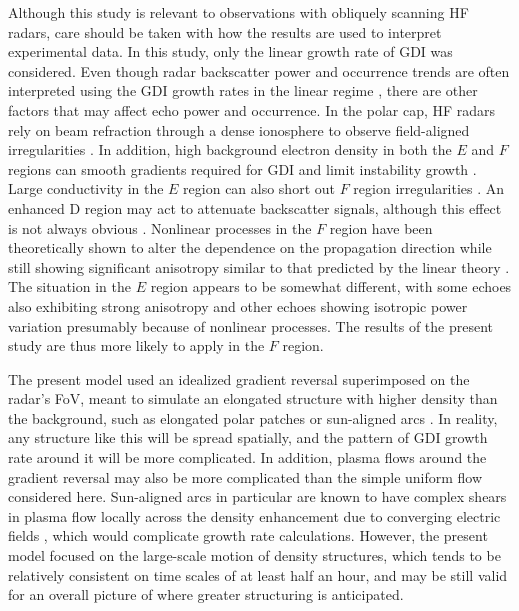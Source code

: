Although this study is relevant to observations with obliquely scanning HF radars, care should be taken with how the results are used to interpret experimental data.  In this study, only the linear growth rate of GDI was considered. Even though radar backscatter power and occurrence trends are often interpreted using the GDI growth rates in the linear regime \citep[e.g.][]{Oksavik2012,Moen2012}, there are other factors that may affect echo power and occurrence.  In the polar cap, HF radars rely on beam refraction through a dense ionosphere to observe field-aligned irregularities \citep{Bristow2011,Koustov2014}.  In addition, high background electron density in both the \(E\) and \(F\) regions can smooth gradients required for GDI and limit instability growth \citep{Ruohoniemi1997,Koustov2004}.  Large conductivity in the \(E\) region can also short out \(F\) region irregularities \citep{Danskin2002,Kane2012,Lamarche2015}.  An enhanced D region may act to attenuate backscatter signals, although this effect is not always obvious \citep{Danskin2002}.  Nonlinear processes in the \(F\) region have been theoretically shown to alter the dependence on the propagation direction while still showing significant anisotropy similar to that predicted by the linear theory \citep{Keskinen1981b,Keskinen1982a,Keskinen1983}.  The situation in the \(E\) region appears to be somewhat different, with some echoes also exhibiting strong anisotropy \citep[e.g.][]{Ierkic1980,Makarevich2008} and other echoes showing isotropic power variation \citep{Ierkic1980,Koustov2001} presumably because of nonlinear processes.  The results of the present study are thus more likely to apply in the \(F\) region.


The present model used an idealized gradient reversal superimposed on the radar's FoV, meant to simulate an elongated structure with higher density than the background, such as elongated polar patches \citep{Hosokawa2014} or sun-aligned arcs \citep{Koustov2012}.  In reality, any structure like this will be spread spatially, and the pattern of GDI growth rate around it will be more complicated.  In addition, plasma flows around the gradient reversal may also be more complicated than the simple uniform flow considered here.  Sun-aligned arcs in particular are known to have complex shears in plasma flow locally across the density enhancement due to converging electric fields \citep[e.g.][]{Kozlovsky2007}, which would complicate growth rate calculations. However, the present model focused on the large-scale motion of density structures, which tends to be relatively consistent on time scales of at least half an hour, and may be still valid for an overall picture of where greater structuring is anticipated.


